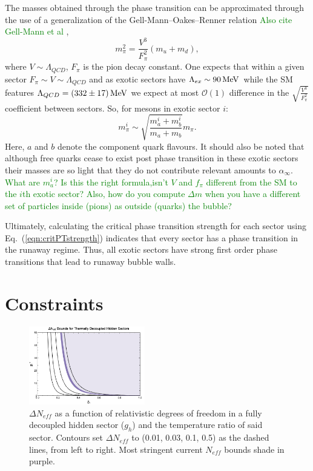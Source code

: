 \documentclass[nofootinbib,twocolumn,preprintnumbers]{revtex4-1}
\begin{document}
The masses obtained through the phase transition can be approximated through the use of a generalization of the Gell-Mann--Oakes--Renner relation \textcolor{green}{Also cite Gell-Mann et al} \cite{Gell-Mann,Schwartz:2013pla},
\begin{equation}\label{eqn:gmor}
m^2_{\pi} = \frac{V^3}{F^2_{\pi}}(m_u + m_d),
\end{equation}
where $V \sim \Lambda_{QCD}$, $F_\pi$ is the pion decay constant. One expects that within a given sector $F_\pi \sim V \sim \Lambda_{QCD}$ \cite{Schwartz:2013pla} and as exotic sectors have $\Lambda_{ex} \sim 90 \,{\rm MeV}$ while the SM features $\Lambda_{QCD} = (332\pm17)\,{\rm MeV}$ \cite{PhysRevD.98.030001} we expect at most $\mathcal{O}(1)$ difference in the $\sqrt{\frac{V^3}{F_\pi^2}}$ coefficient between sectors. So, for mesons in exotic sector $i$:
\begin{equation}
m_{\pi}^i \sim \sqrt{\frac{m_a^i+m_b^i}{m_a + m_b}} m_{\pi}.
\end{equation}
Here, $a$ and $b$ denote the component quark flavours. It should also be noted that although free quarks cease to exist post phase transition in these exotic sectors their masses are so light that they do not contribute relevant amounts to $\alpha_{\infty}$. \textcolor{green}{What are $m_a^i$? Is this the right formula,isn't $V$ and $f_\pi$ different from the SM to the $i$th exotic sector? Also, how do you compute $\Delta m$ when you have a different set of particles inside (pions) as outside (quarks) the bubble?  } 

Ultimately, calculating the critical phase transition strength for each sector using Eq.~(\ref{eqn:critPTstrength}) indicates that every sector has a phase transition in the runaway regime. Thus, all exotic sectors have strong first order phase transitions that lead to runaway bubble walls.

\section{Constraints}
\label{sec:constraints}

\begin{figure}
\centering
\includegraphics[width=0.45\textwidth]{neff.png}
\hfill
\caption{$\Delta N_{eff}$ as a function of relativistic degrees of freedom in a fully decoupled hidden sector ($g_h$) and the temperature ratio of said sector. Contours set $\Delta N_{eff}$ to (0.01, 0.03,  0.1,  0.5) as the dashed lines, from left to right. Most stringent current $N_{eff}$ bounds shade in purple. 
}
\label{fig:neff}
\end{figure}
\end{document}
